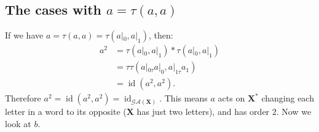 \documentclass[mat1]{fmfdeloTS2.0}
\newcommand{\abece}{\mathbf{X}}			%
\newcommand{\fslovar}{\mathbf{X^*}}		%
\newcommand{\synaut}{\mathcal{GA}}	%
\DeclareMathOperator{\id}{\mathrm{id}}			%
\begin{document}
\subsection{The cases with \texorpdfstring{$a=\tau(a,a)$}{}}

If we have $a=\tau(a,a)=\tau(a|_0,a|_1)$, then:
\begin{equation*}
\begin{split}
a^2 &=\tau(a|_0,a|_1)*\tau(a|_0,a|_1)\\
	&=\tau\tau(a|_{0\tau} a|_0, a|_{1\tau} a_1)\\
	&=\id(a^2,a^2).
\end{split}
\end{equation*}
Therefore $a^2=\id(a^2,a^2)=\id_{\synaut(\abece)}$. This means $a$ acts on $\fslovar$ changing each letter in a word to its opposite ($\abece$ has just two letters), and has order $2$. Now we look at $b$.
\end{document}
